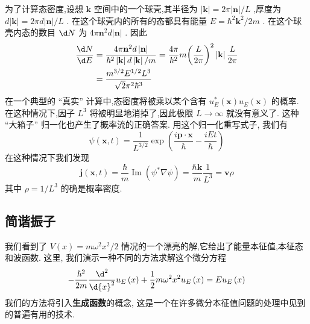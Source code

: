 \documentclass[lang=cn,newtx,10pt,scheme=chinese,thmcnt=section]{elegantbook}
\begin{document}
为了计算态密度,设想 $\mathbf{k}$ 空间中的一个球壳,其半径为 $\left| \mathbf{k}\right| = {2\pi }\left| \mathbf{n}\right| /L$ ,厚度为 $d\left| \mathbf{k}\right| = {2\pi d}\left| \mathbf{n}\right| /L$ . 在这个球壳内的所有的态都具有能量 $E = {\hbar }^{2}{\mathbf{k}}^{2}/{2m}$ . 在这个球壳内态的数目 ${\d N}$ 为 ${4\pi }{\mathbf{n}}^{2}d\left| \mathbf{n}\right|$ . 因此
\begin{equation}
	\begin{aligned}
		\frac{\d N}{\d E} &= \frac{{4\pi }{\mathbf{n}}^{2}d\left| \mathbf{n}\right| }{{\hbar }^{2}\left| \mathbf{k}\right| d\left| \mathbf{k}\right| /m} = \frac{4\pi }{{\hbar }^{2}}m{\left( \frac{L}{2\pi }\right) }^{2}\left| \mathbf{k}\right| \frac{L}{2\pi }\\
		&= \frac{{m}^{3/2}{E}^{1/2}{L}^{3}}{\sqrt{2}{\pi }^{2}{\hbar }^{3}}
	\end{aligned}
\end{equation}
在一个典型的 “真实” 计算中,态密度将被乘以某个含有 ${u}_{E}^{ * }\left( \mathbf{x}\right) {u}_{E}\left( \mathbf{x}\right)$ 的概率. 在这种情况下,因子 ${L}^{3}$ 将被明显地消掉了,因此极限 $L \rightarrow \infty$ 就没有意义了. 这种 “大箱子” 归一化也产生了概率流的正确答案. 用这个归一化重写式子, 我们有
\begin{equation}
	\psi \left( {\mathbf{x}, t}\right) = \frac{1}{{L}^{3/2}}\exp \left( {\frac{i\mathbf{p} \cdot \mathbf{x}}{\hbar } - \frac{iEt}{\hbar }}\right)
\end{equation}
在这种情况下我们发现
\begin{equation}
	\mathbf{j}\left( {\mathbf{x}, t}\right) = \frac{\hbar }{m}\operatorname{Im}\left( {{\psi }^{ * }\nabla \psi }\right) = \frac{\hbar \mathbf{k}}{m}\frac{1}{{L}^{3}} = \mathbf{v}\rho
\end{equation}
其中 $\rho = 1/{L}^{3}$ 的确是概率密度.
\subsection*{简谐振子}
我们看到了 $V\left( x\right) = m{\omega }^{2}{x}^{2}/2$ 情况的一个漂亮的解,它给出了能量本征值,本征态和波函数. 这里, 我们演示一种不同的方法求解这个微分方程
\begin{equation}
	- \frac{{\hbar }^{2}}{2m}\frac{{\d}^{2}}{\d {x}^{2}}{u}_{E}\left( x\right) + \frac{1}{2}m{\omega }^{2}{x}^{2}{u}_{E}\left( x\right) = E{u}_{E}\left( x\right)
\end{equation}
我们的方法将引入\textbf{生成函数}的概念, 这是一个在许多微分本征值问题的处理中见到的普遍有用的技术.
\end{document}
